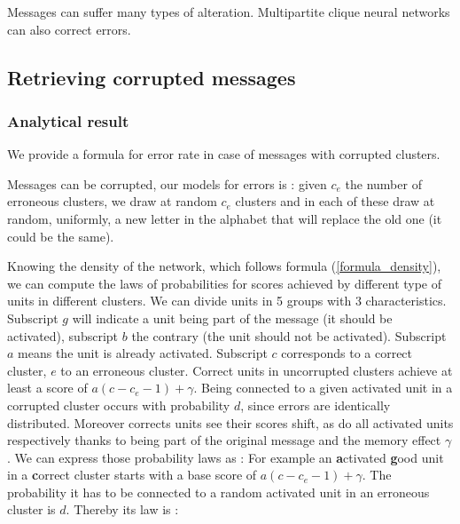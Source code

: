\documentclass[english,10pt,twocolumn]{IEEEtran}
\theoremstyle{definition}
\begin{document}
	Messages can suffer many types of alteration. Multipartite clique neural networks can also correct errors.	
	
	\subsection{Retrieving corrupted messages}
	
	\subsubsection{Analytical result}
%	
%	
%	
%	
%	
	
	We provide a formula for error rate in case of messages with corrupted clusters.

	Messages can be corrupted, our models for errors is : given $c_e$ the number of erroneous clusters, we draw at random $c_e$ clusters and in each of these draw at random, uniformly, a new letter in the alphabet that will replace the old one (it could be the same).
	
	Knowing the density of the network, which follows formula (\ref{formula_density}), we can compute the laws of probabilities for scores achieved by different type of units in different clusters. We can divide units in 5 groups with 3 characteristics. Subscript $g$ will indicate a unit being part of the message (it should be activated), subscript $b$ the contrary (the unit should not be activated). Subscript $a$ means the unit is already activated. Subscript $c$ corresponds to a correct cluster, $e$ to an erroneous cluster.
	Correct units in uncorrupted clusters achieve at least a score of $a(c-c_e - 1) + \gamma$. 
	Being connected to a given activated unit in a corrupted cluster occurs with probability $d$, since errors are identically distributed. Moreover corrects units see their scores shift, as do all activated units respectively thanks to being part of the original message and the memory effect $\gamma$. We can express those probability laws as : 
	For example an \textbf{a}ctivated \textbf{g}ood unit in a \textbf{c}orrect cluster starts with a base score of $ a(c - c_e - 1) + \gamma$. The probability it has to be connected to a random activated unit in an erroneous cluster is $d$. Thereby its law is :
	
\end{document}
